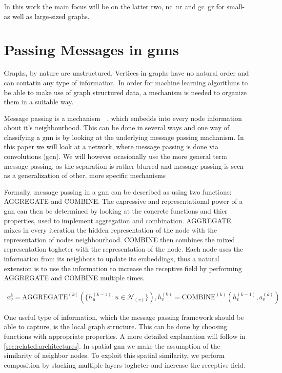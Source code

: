 In this work the main focus will be on the latter two, \ac{nc}\ \ac{nr} and \ac{gc}\
\ac{gr} for small- as well as large-sized graphs.

\section{Passing Messages in \Acsp*{gnn}}
\label{sec:related:message}

Graphs, by nature are unstructured. Vertices in graphs have no natural order and can
contatin any type of information. In order for machine learning algorithms to be able
to make use of graph structured data, a mechanism is needed to organize them in a
suitable way.
\cite{Zhou2020a}
\cite{Hamilton2017a}
\cite{Zhang19}


Message passing is a mechanism~\cite{Xu2019}~\cite{Zhou2020a}, which embedds into every node information about it's neighbourhood.
This can be done in several ways and one way of classifying a \ac{gnn} is by looking at the
underlying message passing machanism. In this paper we will look at a network, where message passing is done
via convolutions (\acf{gcn}). We will however ocasionally use the more general term message passing, as
the separation is rather blurred and message passing is seen as a generalization of
other, more specific mechanisms

Formally, message passing in a \ac{gnn} can be described as using two functions:
AGGREGATE and COMBINE. The expressive and representational power of a \ac{gnn} can
then be determined by looking at the concrete functions and thier properties, used to implement
aggregation and combination. AGGREGATE mixes in every iteration the hidden representation of the node
with the representation of nodes neighbourhood. COMBINE then combines the mixed representation togheter with the
representation of the node. Each node uses the information from its neighbors to update its embeddings, thus a natural
extension is to use the information to increase the receptive field by performing AGGREGATE and COMBINE multiple
times.

\begin{align*}
    a_{v}^{k} = \mathrm{AGGREGATE}^{(k)}(\{h_{u}^{(k-1)}: u \in \mathcal{N}_{(v)}\}) , h_{v}^{(k)} = \mathrm{COMBINE}^{(k)}(h_{v}^{(k-1)}, a_{v}^{(k)})
\end{align*}

One useful type of information, which the message passing framework should be able to
capture, is the local graph structure. This can be done by choosing functions with
appropriate properties. A more detailed explanation will follow in
\cref{sec:related:architectures}. In spatial \ac{gnn} we make the assumption of the
similarity of neighbor nodes. To exploit this spatial similarity, we perform
composition by stacking multiple layers togheter and increase the receptive field.


